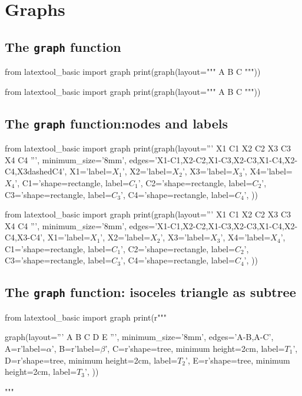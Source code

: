 \section{Graphs}

\subsection{The \texttt{graph} function}

\begin{console}
\begin{python}
from latextool_basic import graph
print(graph(layout="""
A
B C
"""))
\end{python}
\end{console}

\begin{python}
from latextool_basic import graph
print(graph(layout="""
A
B C
"""))
\end{python}



\newpage
\subsection{The \texttt{graph} function:nodes and labels}
\begin{console}
\begin{python}
from latextool_basic import graph
print(graph(layout='''
     X1  C1
     X2  C2
     X3  C3
     X4  C4
''',
minimum_size='8mm',
edges='X1-C1,X2-C2,X1-C3,X2-C3,X1-C4,X2-C4,X3dashedC4',
X1='label=$X_1$',
X2='label=$X_2$',
X3='label=$X_3$',
X4='label=$X_4$',
C1='shape=rectangle, label=$C_1$',
C2='shape=rectangle, label=$C_2$',
C3='shape=rectangle, label=$C_3$',
C4='shape=rectangle, label=$C_4$',
))
\end{python}
\end{console}

\begin{python}
from latextool_basic import graph
print(graph(layout='''
     X1  C1
     X2  C2
     X3  C3
     X4  C4
''',
minimum_size='8mm',
edges='X1-C1,X2-C2,X1-C3,X2-C3,X1-C4,X2-C4,X3-C4',
X1='label=$X_1$',
X2='label=$X_2$',
X3='label=$X_3$',
X4='label=$X_4$',
C1='shape=rectangle, label=$C_1$',
C2='shape=rectangle, label=$C_2$',
C3='shape=rectangle, label=$C_3$',
C4='shape=rectangle, label=$C_4$',
))
\end{python}



\newpage
\subsection{The \texttt{graph} function:
  isoceles triangle as subtree}
\begin{python}
from latextool_basic import graph
print(r"""
\begin{console}
graph(layout='''
     A
   B   C
  D E
''',
minimum_size='8mm',
edges='A-B,A-C',
A=r'label=$\alpha$',
B=r'label=$\beta$',
C=r'shape=tree, minimum height=2cm, label=$T_1$',
D=r'shape=tree, minimum height=2cm, label=$T_2$',
E=r'shape=tree, minimum height=2cm, label=$T_3$',
))
\end{console}"""
\end{python}

